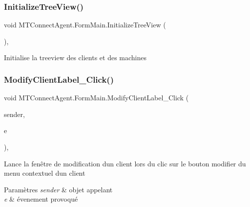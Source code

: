 \subsubsection{\texorpdfstring{Initialize\+Tree\+View()}{InitializeTreeView()}}
{\footnotesize\ttfamily void M\+T\+Connect\+Agent.\+Form\+Main.\+Initialize\+Tree\+View (\begin{DoxyParamCaption}{ }\end{DoxyParamCaption})\hspace{0.3cm}{\ttfamily [inline]}, {\ttfamily [private]}}



Initialise la treeview des clients et des machines 

\mbox{\label{class_m_t_connect_agent_1_1_form_main_adf54b84f7d625d8656f6e6114c8da775}} 
\subsubsection{\texorpdfstring{Modify\+Client\+Label\+\_\+\+Click()}{ModifyClientLabel\_Click()}}
{\footnotesize\ttfamily void M\+T\+Connect\+Agent.\+Form\+Main.\+Modify\+Client\+Label\+\_\+\+Click (\begin{DoxyParamCaption}\item[{object}]{sender,  }\item[{Event\+Args}]{e }\end{DoxyParamCaption})\hspace{0.3cm}{\ttfamily [inline]}, {\ttfamily [private]}}



Lance la fenêtre de modification d\textquotesingle{}un client lors du clic sur le bouton modifier du menu contextuel d\textquotesingle{}un client 


\begin{DoxyParams}{Paramètres}
{\em sender} & objet appelant\\
\hline
{\em e} & évenement provoqué\\
\hline
\end{DoxyParams}
\mbox{\label{class_m_t_connect_agent_1_1_form_main_ab8577129e9dfbf78979a80aaf5e7bf6a}} 
